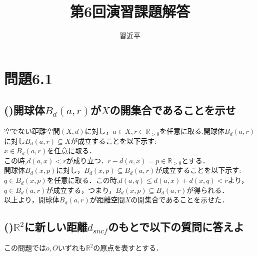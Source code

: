 \documentclass{jreport}
\newcommand{\ds}{d_{sncf}}
\newcommand{\bd}{B_d}
\newcommand{\R}{\mathbb{R}}
\newcommand{\Rp}{\mathbb{R}_{>0}}
\begin{document}
\title{第6回演習課題解答}
\author{習近平}
\maketitle
\setcounter{chapter}{6}
\newpage
\tableofcontents
{}
\newpage
\section{問題6.1}
\subsection{()開球体$\bd (a,r)$が$X$の開集合であることを示せ}
空でない距離空間$(X,d)$に対し，$a \in X,r \in \Rp $を任意に取る.開球体$\bd (a,r)$に対し$\bd (a,r) \subseteq X$が成立することを以下示す:\\
$x \in \bd(a,r) $を任意に取る．\\
この時,$d(a,x)<r$が成り立つ．$r - d(a,x) = p \in \Rp$とする．\\
開球体$\bd(x,p)$に対し，$\bd(x,p) \subseteq \bd(a,r)$が成立することを以下示す:\\
$q \in \bd(x,p)$を任意に取る．この時,$d(a,q) \le d(a,x) + d(x,q) < r$より，\\
$q \in \bd(a,r)$が成立する，つまり，$\bd(x,p) \subseteq \bd(a,r)$が得られる．\\
以上より，開球体$\bd(a,r)$が距離空間$X$の開集合であることを示せた．

\newpage

\subsection{()$\R^2$に新しい距離$\ds$のもとで以下の質問に答えよ}
この問題では$o,O$いずれも$\R^2$の原点を表すとする．
\end{document}
